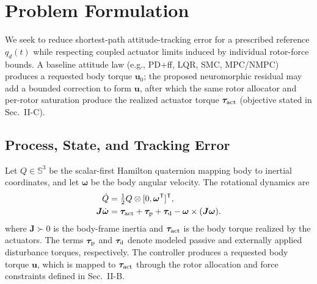 \documentclass[letterpaper, 10 pt, conference]{ieeeconf}
\newcommand{\T}{^{\mathsf T}}
\begin{document}


\section{Problem Formulation}
\label{sec:problem}
We seek to reduce shortest-path attitude-tracking error for a prescribed reference $q_d(t)$ while respecting coupled actuator limits induced by individual rotor-force bounds. A baseline attitude law (e.g., PD+ff, LQR, SMC, MPC/NMPC) produces a requested body torque $\bm u_0$; the proposed neuromorphic residual may add a bounded correction to form $\bm u$, after which the same rotor allocator and per-rotor saturation produce the realized actuator torque $\bm\tau_{\rm act}$ (objective stated in Sec.~II-C).

\subsection{Process, State, and Tracking Error}

Let $Q\in\mathbb S^3$ be the scalar-first Hamilton quaternion mapping body to
inertial coordinates, and let $\bm\omega$ be the body angular velocity. The
rotational dynamics are \cite{schaub2018amss}
\begin{align}
 \dot Q&=\tfrac12 Q\otimes[0,\bm\omega\T]\T,\\
 \bm J\dot{\bm\omega}&=\bm\tau_{\rm act}+\bm\tau_{\rm p}
       +\bm\tau_{\rm d}-\bm\omega\times(\bm J\bm\omega).
 \label{eq:plant}
\end{align}
where $\bm J\succ0$ is the body-frame inertia and
$\bm\tau_{\rm act}$ is the body torque realized by the actuators.
The terms $\bm\tau_{\rm p}$ and $\bm\tau_{\rm d}$ denote modeled
passive and externally applied disturbance torques, respectively.
The controller produces a requested body torque $\bm u$, which is
mapped to $\bm\tau_{\rm act}$ through the rotor allocation and force
constraints defined in Sec.~II-B.
\end{document}
